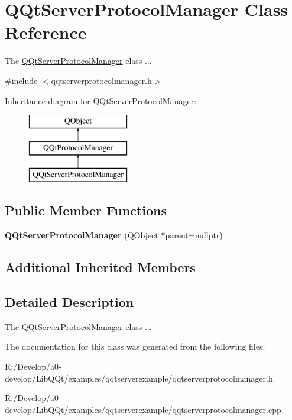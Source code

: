 \hypertarget{class_q_qt_server_protocol_manager}{}\section{Q\+Qt\+Server\+Protocol\+Manager Class Reference}
\label{class_q_qt_server_protocol_manager}


The \mbox{\hyperlink{class_q_qt_server_protocol_manager}{Q\+Qt\+Server\+Protocol\+Manager}} class ...  




{\ttfamily \#include $<$qqtserverprotocolmanager.\+h$>$}

Inheritance diagram for Q\+Qt\+Server\+Protocol\+Manager\+:\begin{figure}[H]
\begin{center}
\leavevmode
\includegraphics[height=3.000000cm]{class_q_qt_server_protocol_manager}
\end{center}
\end{figure}
\subsection*{Public Member Functions}
\begin{DoxyCompactItemize}
\item 
\mbox{\label{class_q_qt_server_protocol_manager_ae89a8cacb2ce76b5c3a553d3a72b591f}} 
{\bfseries Q\+Qt\+Server\+Protocol\+Manager} (Q\+Object $\ast$parent=nullptr)
\end{DoxyCompactItemize}
\subsection*{Additional Inherited Members}


\subsection{Detailed Description}
The \mbox{\hyperlink{class_q_qt_server_protocol_manager}{Q\+Qt\+Server\+Protocol\+Manager}} class ... 

The documentation for this class was generated from the following files\+:\begin{DoxyCompactItemize}
\item 
R\+:/\+Develop/a0-\/develop/\+Lib\+Q\+Qt/examples/qqtserverexample/qqtserverprotocolmanager.\+h\item 
R\+:/\+Develop/a0-\/develop/\+Lib\+Q\+Qt/examples/qqtserverexample/qqtserverprotocolmanager.\+cpp\end{DoxyCompactItemize}
